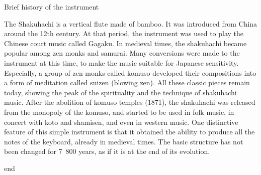 ﻿
Brief history of the instrument

The Shakuhachi is a vertical flute made of bamboo. It was introduced from China around the 12th century. At that period, the instrument was used to play the Chinese court music called Gagaku. In medieval times, the shakuhachi became popular 
among zen monks and samurai. Many conversions were made to the instrument at this time, to make the music suitable
for Japanese sensitivity. Especially, a group of zen monks called komuso developed their compositions into a form of    
meditation called suizen (blowing zen). All these classic pieces remain today, showing the peak of the spirituality and the 
technique of shakuhachi music. After the abolition of komuso temples (1871), the shakuhachi was released from the monopoly of the komuso, and started to be used in folk music, in concert with koto and shamisen, and even in western 
music. One distinctive feature of this simple instrument is that it obtained the ability to produce all the notes
of the keyboard, already in medieval times. The basic structure has not been changed for 7~800 years, as if it is at the end of its evolution.

                                                 end 
